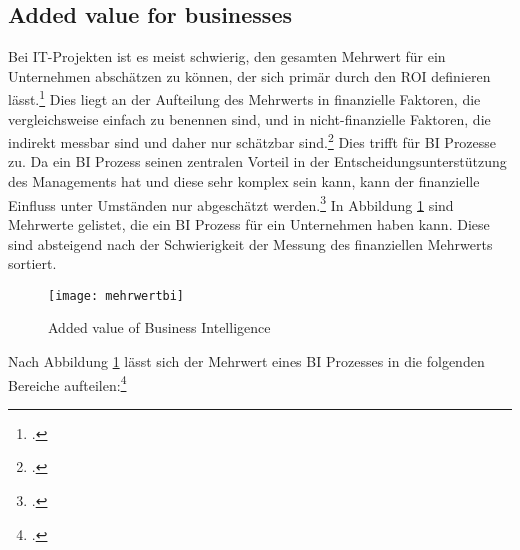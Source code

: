 \subsection{Added value for businesses} \label{toc:strategischermehrwert}

Bei IT-Projekten ist es meist schwierig, den gesamten Mehrwert für ein Unternehmen abschätzen zu können, der sich primär durch
den \ac{ROI} definieren lässt.\footcite[Cf.][p. 97]{hovcevar2010assessing} Dies liegt an der Aufteilung des Mehrwerts
in finanzielle Faktoren, die vergleichsweise einfach zu benennen sind, und in nicht-finanzielle Faktoren, die indirekt messbar
sind und daher nur schätzbar sind.\footcite[Cf.][p. 93]{hovcevar2010assessing} Dies trifft für \ac{BI} Prozesse zu. Da ein \ac{BI}
Prozess seinen zentralen Vorteil in der Entscheidungsunterstützung des Managements hat und diese sehr komplex sein kann, kann der
finanzielle Einfluss unter Umständen nur abgeschätzt werden.\footcite[Cf.][p. 94f]{hovcevar2010assessing} In Abbildung
\ref{figure:mehrwertbi} sind Mehrwerte gelistet, die ein \ac{BI} Prozess für ein Unternehmen haben kann. Diese sind absteigend
nach der Schwierigkeit der Messung des finanziellen Mehrwerts sortiert.

\begin{figure}[H]
    \caption{Added value of Business Intelligence}
    \texttt{[image: mehrwertbi]}
    \label{figure:mehrwertbi}
    \\
    \cite[Source: Based on][Fig. 2]{watson2007current}
\end{figure}

Nach Abbildung \ref{figure:mehrwertbi} lässt sich der Mehrwert eines BI Prozesses in die folgenden Bereiche
aufteilen:\footcite[Cf.][Fig. 2]{watson2007current}


